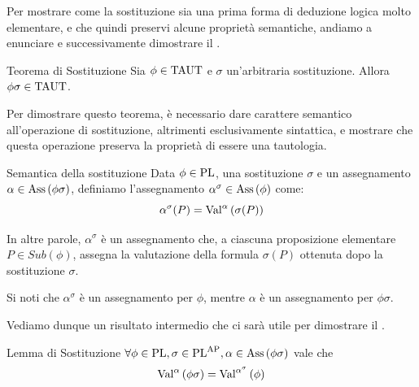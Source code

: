Per mostrare come la sostituzione sia una prima forma di deduzione logica molto elementare, e che quindi preservi alcune proprietà semantiche, andiamo a enunciare e successivamente dimostrare il .

\begin{theorem}[namedlabel={thm:substitution}{Teorema di Sostituzione}]{Teorema di Sostituzione}
  Sia \(\phi\in \Taut\) e \(\sigma\) un'arbitraria sostituzione. Allora \(\phi\sigma\in \Taut\).
\end{theorem}

Per dimostrare questo teorema, è necessario dare carattere semantico all'operazione di sostituzione, altrimenti esclusivamente sintattica, e mostrare che questa operazione preserva la proprietà di essere una tautologia.

\begin{definition}{Semantica della sostituzione}
  Data \(\phi \in \operatorname{PL}\), una sostituzione \(\sigma\) e un assegnamento \(\alpha \in \operatorname{Ass}\left(\phi\sigma\right)\), definiamo l'assegnamento \(\alpha^\sigma \in \operatorname{Ass}\left(\phi\right)\) come:
  \[\alpha^\sigma(P)=\Val{\alpha}[\sigma(P)]\]
\end{definition}

In altre parole, \(\alpha^{\sigma}\) è un assegnamento che, a ciascuna proposizione elementare \(P\in Sub(\phi)\), assegna la valutazione della formula \(\sigma(P)\) ottenuta dopo la sostituzione \(\sigma\).

\begin{note}{}
  Si noti che \(\alpha^\sigma\) è un assegnamento per \(\phi\), mentre \(\alpha\) è un assegnamento per \(\phi\sigma\).
\end{note}

Vediamo dunque un risultato intermedio che ci sarà utile per dimostrare il .
\begin{lemma}[namedlabel={lem:substitution}{Lemma di Sostituzione}]{Lemma di Sostituzione}
  \(\forall \phi \in \PL, \sigma \in \PL^{\AP}, \alpha \in \Ass{\phi\sigma}\) vale che
  \[\Val{\alpha}[\phi\sigma]=\Val{\alpha^\sigma}[\phi]\]
\end{lemma}

